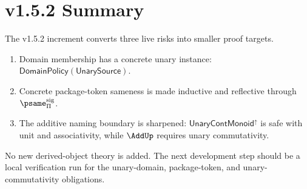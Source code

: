 
\chapter{v1.5.2 Summary}
\label{ch:v152-summary}

The v1.5.2 increment converts three live risks into smaller proof targets.

\begin{enumerate}
  \item Domain membership has a concrete unary instance: \(\mathsf{DomainPolicy}(\mathsf{UnarySource})\).
  \item Concrete package-token sameness is made inductive and reflective through \(\psame_{\Pi}^{\mathrm{sig}}\).
  \item The additive naming boundary is sharpened: \(\mathsf{UnaryContMonoid}^{\uparrow}\) is safe with unit and associativity, while \(\AddUp\) requires unary commutativity.
\end{enumerate}

No new derived-object theory is added. The next development step should be a local verification run for the unary-domain, package-token, and unary-commutativity obligations.
